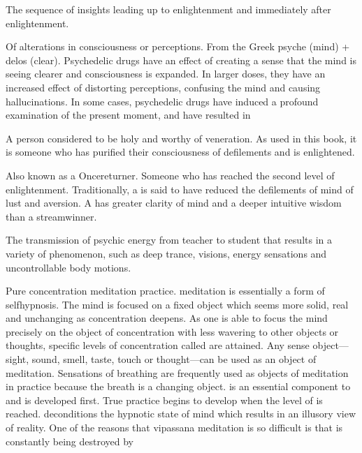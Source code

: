 \documentclass[a5paper,10pt,english]{book}
\begin{document}
\begin{description}
\sphinxAtStartPar
The sequence of insights leading up to
enlightenment and immediately after enlightenment.

\sphinxAtStartPar
Of alterations in consciousness or perceptions. From the
Greek psyche (mind) + delos (clear). Psychedelic drugs have an effect of
creating a sense that the mind is seeing clearer and consciousness is
expanded. In larger doses, they have an increased effect of distorting
perceptions, confusing the mind and causing hallucinations. In some
cases, psychedelic drugs have induced a profound examination of the
present moment, and have resulted in 

\sphinxAtStartPar
A person considered to be holy and worthy of veneration. As used
in this book, it is someone who has purified their consciousness of
defilements and is enlightened.

\sphinxAtStartPar
Also known as a Once\sphinxhyphen{}returner. Someone who has reached the
second level of enlightenment. Traditionally, a  is said
to have reduced the defilements of mind of lust and aversion. A
 has greater clarity of mind and a deeper intuitive wisdom
than a stream\sphinxhyphen{}winner.

\sphinxAtStartPar
The transmission of psychic energy from teacher to student
that results in a variety of phenomenon, such as deep trance, visions,
energy sensations and uncontrollable body motions.

\sphinxAtStartPar
Pure concentration meditation practice.  meditation
is essentially a form of self\sphinxhyphen{}hypnosis. The mind is focused on a fixed
object which seems more solid, real and unchanging as concentration
deepens. As one is able to focus the mind precisely on the object
of concentration with less wavering to other objects or thoughts,
specific levels of concentration called  are attained. Any
sense object—sight, sound, smell, taste, touch or thought—can be used as
an object of  meditation. Sensations of breathing are
frequently used as objects of meditation in  practice
because the breath is a changing object.  is an essential
component to  and is developed first. True 
practice begins to develop when the level of  is
reached.  deconditions the hypnotic state of mind which
results in an illusory view of reality. One of the reasons that
vipassana meditation is so difficult is that  is constantly
being destroyed by 


\end{description}
\end{document}
